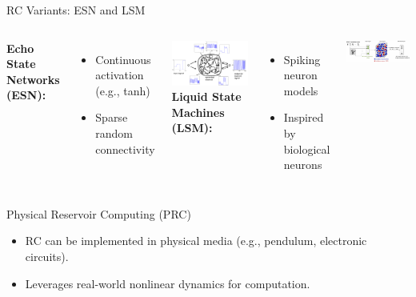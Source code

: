 \documentclass{beamer}
\begin{document}
\begin{frame}{RC Variants: ESN and LSM}
  \begin{columns}
    \textbf{Echo State Networks (ESN):}
    \begin{itemize}
      \item Continuous activation (e.g., tanh)
      \item Sparse random connectivity
    \end{itemize}
    \includegraphics[width=\linewidth]{figures/ESN_diag_FreqGenSchema.png}
    \textbf{Liquid State Machines (LSM):}
    \begin{itemize}
      \item Spiking neuron models
      \item Inspired by biological neurons
    \end{itemize}
    \includegraphics[width=\linewidth]{figures/lsm_diag.png}
  \end{columns}
\end{frame}

\begin{frame}{Physical Reservoir Computing (PRC)}
  \begin{itemize}
    \item RC can be implemented in physical media (e.g., pendulum, electronic circuits).
    \item Leverages real-world nonlinear dynamics for computation.
  \end{itemize}
\end{frame}
\end{document}
